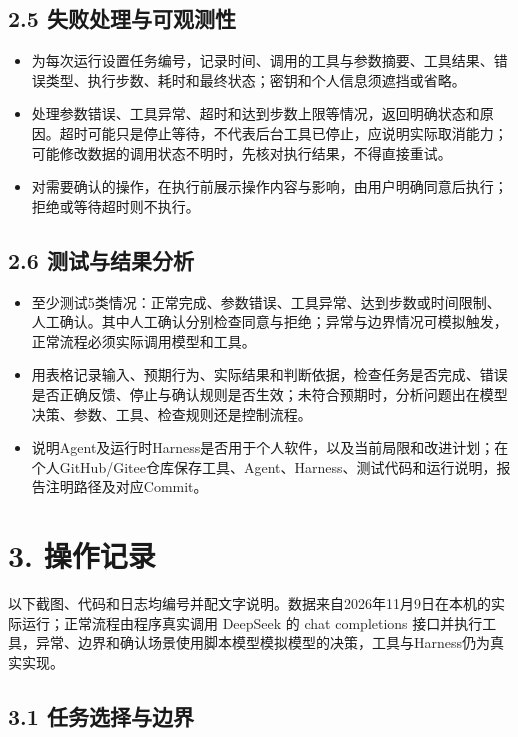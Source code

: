 \documentclass[UTF8,12pt,a4paper]{ctexart}
\begin{document}
\subsection*{2.5 失败处理与可观测性}

\begin{itemize}
  \item 为每次运行设置任务编号，记录时间、调用的工具与参数摘要、工具结果、错误类型、执行步数、耗时和最终状态；密钥和个人信息须遮挡或省略。
  \item 处理参数错误、工具异常、超时和达到步数上限等情况，返回明确状态和原因。超时可能只是停止等待，不代表后台工具已停止，应说明实际取消能力；可能修改数据的调用状态不明时，先核对执行结果，不得直接重试。
  \item 对需要确认的操作，在执行前展示操作内容与影响，由用户明确同意后执行；拒绝或等待超时则不执行。
\end{itemize}

\subsection*{2.6 测试与结果分析}

\begin{itemize}
  \item 至少测试5类情况：正常完成、参数错误、工具异常、达到步数或时间限制、人工确认。其中人工确认分别检查同意与拒绝；异常与边界情况可模拟触发，正常流程必须实际调用模型和工具。
  \item 用表格记录输入、预期行为、实际结果和判断依据，检查任务是否完成、错误是否正确反馈、停止与确认规则是否生效；未符合预期时，分析问题出在模型决策、参数、工具、检查规则还是控制流程。
  \item 说明Agent及运行时Harness是否用于个人软件，以及当前局限和改进计划；在个人GitHub/Gitee仓库保存工具、Agent、Harness、测试代码和运行说明，报告注明路径及对应Commit。
\end{itemize}

\section*{3. 操作记录}

以下截图、代码和日志均编号并配文字说明。数据来自2026年11月9日在本机的实际运行；正常流程由程序真实调用 DeepSeek 的 chat completions 接口并执行工具，异常、边界和确认场景使用脚本模型模拟模型的决策，工具与Harness仍为真实实现。

\subsection*{3.1 任务选择与边界}
\end{document}
